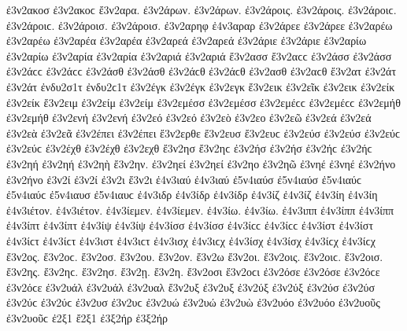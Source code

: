 {ἐ3ν2ακοσ ἐ3ν2ακοϲ 
ἔ3ν2αρα.   %
ἐ3ν2άρων. ἐ3ν2άρων. 
ἐ3ν2άροις. ἐ3ν2άροις. ἐ3ν2άροιϲ. ἐ3ν2άροιϲ. 
ἐ3ν2άροισ. ἐ3ν2άροισ. 
ἐ3ν2αρηφ   %
ἐ4ν3αραρ   %
ἐ3ν2άρεε ἐ3ν2άρεε   %
ἐ3ν2αρέω ἐ3ν2αρέω 
ἐ3ν2αρέα ἐ3ν2αρέα   %
ἐ3ν2αρεά ἐ3ν2αρεά 
ἐ3ν2άριε ἐ3ν2άριε   %
ἐ3ν2αρίω ἐ3ν2αρίω 
ἐ3ν2αρία ἐ3ν2αρία   %
ἐ3ν2αριά ἐ3ν2αριά 
ἔ3ν2ασσ ἔ3ν2αϲϲ   %
ἐ3ν2άσσ ἐ3ν2άσσ ἐ3ν2άϲϲ ἐ3ν2άϲϲ 
ἐ3ν2άσθ ἐ3ν2άσθ ἐ3ν2άϲθ ἐ3ν2άϲθ 
ἐ3ν2ασθ ἐ3ν2αϲθ 
ἔ3ν2ατ   %
ἐ3ν2άτ ἐ3ν2άτ 
ἐνδυ2σ1τ ἐνδυ2ϲ1τ   %
ἐ3ν2έγκ ἐ3ν2έγκ   %
ἐ3ν2εγκ   %
ἔ3ν2εικ   %
ἐ3ν2εῖκ   %
ἐ3ν2εικ   %
ἐ3ν2είκ ἐ3ν2είκ   %
ἔ3ν2ειμ   %
ἐ3ν2είμ ἐ3ν2είμ 
ἐ3ν2εμέσσ ἐ3ν2εμέσσ ἐ3ν2εμέϲϲ ἐ3ν2εμέϲϲ   %
ἐ3ν2εμήθ ἐ3ν2εμήθ   %
ἐ3ν2ενή ἐ3ν2ενή   %
ἐ3ν2εό ἐ3ν2εό   %
ἐ3ν2εὸ 
ἐ3ν2εο 
ἐ3ν2εῶ 
ἐ3ν2εά ἐ3ν2εά 
ἐ3ν2εὰ 
ἐ3ν2εᾶ 
ἐ3ν2έπει ἐ3ν2έπει 
ἔ3ν2ερθε   %
ἔ3ν2ευσ ἔ3ν2ευϲ   %
ἐ3ν2εύσ ἐ3ν2εύσ ἐ3ν2εύϲ ἐ3ν2εύϲ   %
ἐ3ν2έχθ ἐ3ν2έχθ   %
ἐ3ν2εχθ 
ἔ3ν2ησ ἔ3ν2ηϲ   %
ἐ3ν2ήσ ἐ3ν2ήσ ἐ3ν2ήϲ ἐ3ν2ήϲ 
ἐ3ν2ηή ἐ3ν2ηή   %
ἐ3ν2ηὴ 
ἔ3ν2ην.   %
ἐ3ν2ηεί ἐ3ν2ηεί   %
ἐ3ν2ηο 
ἐ3ν2ηῶ 
ἐ3νηέ ἐ3νηέ 
ἐ3ν2ήνο ἐ3ν2ήνο   %
ἐ3ν2ί ἐ3ν2ί 
ἐ3ν2ι 
ἔ3ν2ι 
ἐ4ν3ιαύ ἐ4ν3ιαύ   %
ἐ5ν4ιαύσ ἐ5ν4ιαύσ ἐ5ν4ιαύϲ ἐ5ν4ιαύϲ   %
ἐ5ν4ιαυσ ἐ5ν4ιαυϲ 
ἐ4ν3ιδρ   %
ἐ4ν3ίδρ ἐ4ν3ίδρ   %
ἐ4ν3ίζ ἐ4ν3ίζ   %
ἐ4ν3ίη ἐ4ν3ίη   %
ἐ4ν3ιέτον. ἐ4ν3ιέτον. 
ἐ4ν3ίεμεν. ἐ4ν3ίεμεν. 
ἐ4ν3ίω. ἐ4ν3ίω. 
ἐ4ν3ιππ   %
ἐ4ν3ίππ ἐ4ν3ίππ   %
ἐ4ν3ίπτ ἐ4ν3ίπτ   %
ἐ4ν3ίψ ἐ4ν3ίψ 
ἐ4ν3ίσσ ἐ4ν3ίσσ ἐ4ν3ίϲϲ ἐ4ν3ίϲϲ   %
ἐ4ν3ίστ ἐ4ν3ίστ ἐ4ν3ίϲτ ἐ4ν3ίϲτ   %
ἐ4ν3ιστ ἐ4ν3ιϲτ 
ἐ4ν3ισχ ἐ4ν3ιϲχ   %
ἐ4ν3ίσχ ἐ4ν3ίσχ ἐ4ν3ίϲχ ἐ4ν3ίϲχ   %
ἔ3ν2ος. ἔ3ν2οϲ.   %
ἔ3ν2οσ. 
ἔ3ν2ου. 
ἔ3ν2ον. 
ἔ3ν2ω 
ἔ3ν2οι. 
ἔ3ν2οις. ἔ3ν2οιϲ. 
ἔ3ν2οισ. 
ἔ3ν2ης. ἔ3ν2ηϲ. 
ἔ3ν2ησ. 
ἔ3ν2ῃ. 
ἔ3ν2η. 
ἔ3ν2οσι ἔ3ν2οϲι   %
ἐ3ν2όσε ἐ3ν2όσε ἐ3ν2όϲε ἐ3ν2όϲε 
ἐ3ν2υάλ ἐ3ν2υάλ   %
ἐ3ν2υαλ 
ἔ3ν2υξ   %
ἐ3ν2υξ   %
ἐ3ν2ύξ ἐ3ν2ύξ   %
ἐ3ν2ύσ ἐ3ν2ύσ ἐ3ν2ύϲ ἐ3ν2ύϲ   %
ἐ3ν2υσ ἐ3ν2υϲ 
ἐ3ν2υώ ἐ3ν2υώ   %
ἐ3ν2υὼ 
ἐ3ν2υόο ἐ3ν2υόο 
ἐ3ν2υοῦς ἐ3ν2υοῦϲ 
ἐ2ξ1 
ἔ2ξ1 
ἐ3ξ2ήρ ἐ3ξ2ήρ   %
}
